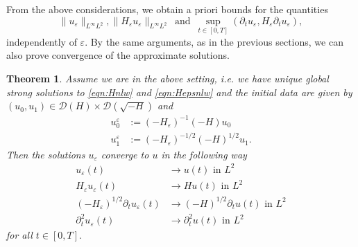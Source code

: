 \documentclass[11pt, oneside]{article}   	%
\newcommand{\tmop}[1]{\ensuremath{\operatorname{#1}}}
\newtheorem{theorem}{Theorem}[section]
\begin{document}
From the above considerations, we obtain a priori bounds for the quantities
\[ \| u_{\varepsilon} \|_{L^\infty L^2}, \| H_{\varepsilon} u_{\varepsilon} \|_{L^\infty L^2}
\ \tmop{and} \ \sup\limits_{t\in[0,T]}(\partial_t u_{\varepsilon}, H_\varepsilon \partial_t u_{\varepsilon}), \]
independently of $\varepsilon$. By the same arguments, as in the
previous sections, we can also prove convergence of the approximate solutions.
\begin{theorem} \label{thm:waveapp}
	Assume we are in the above setting, i.e. we have unique global strong solutions to \eqref{eqn:Hnlw} and \eqref{eqn:Hepsnlw} and the initial data are given by $(u_0,u_1)\in\mathscr{D}(H)\times\mathscr{D}(\sqrt{-H})$ and 
	\begin{align*}
	u_0^\varepsilon&:=(-H_\varepsilon)^{-1}(-H) u_0\\
	u_1^\varepsilon&:=(-H_\varepsilon)^{-1/2}(-H)^{1/2} u_1.
	\end{align*}
	Then the solutions $u_\varepsilon$ converge to $u$ in the following way
		\begin{align*}
		u_{\varepsilon}(t)&\to u(t) \text{ in }L^2\\
		H_\varepsilon u_{\varepsilon}(t) &\to H u(t) \text{ in }L^2\\
		(-H_\varepsilon)^{1/2}\partial_tu_{\varepsilon}(t)&\to (-H)^{1/2}\partial_tu(t) \text{ in }L^2\\
		\partial_t^2u_{\varepsilon}(t)&\to \partial^2_tu(t) \text{ in }L^2
		\end{align*} 
		for all $t\in[0,T].$
\end{theorem}
\end{document}
